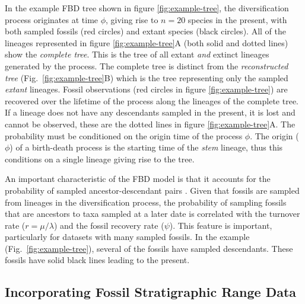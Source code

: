 In the example FBD tree shown in figure \ref{fig:example-tree}, the diversification process originates at time $\phi$, giving rise to $n=20$ species in the present, with both sampled fossils (red circles) and extant species (black circles). 
All of the lineages represented in figure \ref{fig:example-tree}A (both solid and dotted lines) show the \textit{complete tree}. 
This is the tree of all extant \textit{and} extinct lineages generated by the process.
The complete tree is distinct from the \textit{reconstructed tree} (Fig.\ \ref{fig:example-tree}B) which is the tree representing only the sampled \textit{extant} lineages.
Fossil observations (red circles in figure \ref{fig:example-tree}) are recovered over the lifetime of the process along the lineages of the complete tree. 
If a lineage does not have any descendants sampled in the present, it is lost and cannot be observed, these are the dotted lines in figure \ref{fig:example-tree}A. 
The probability must be conditioned on the origin time of the process $\phi$. 
The origin ($\phi$) of a birth-death process is the starting time of the \textit{stem} lineage, thus this conditions on a single lineage giving rise to the tree.


An important characteristic of the FBD model is that it accounts for the probability of sampled ancestor-descendant pairs \citep{foote1996}. 
Given that fossils are sampled from lineages in the diversification process, the probability of sampling fossils that are ancestors to taxa sampled at a later date is correlated with the turnover rate ($r=\mu/\lambda$) and the fossil recovery rate ($\psi$).
This feature is important, particularly for datasets with many sampled fossils. 
In the example (Fig.\ \ref{fig:example-tree}), several of the fossils have sampled descendants. These fossils have solid black lines leading to the present. 

\bigskip
\subsection{Incorporating Fossil Stratigraphic Range Data}\label{subsect:Intro-TipSampling}

